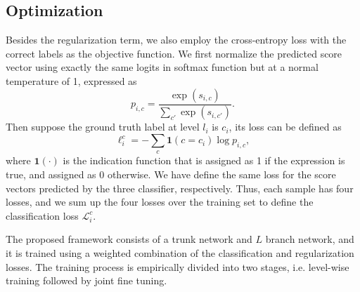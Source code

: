 \documentclass[sigconf]{acmart}
\begin{document}
\subsection{Optimization}
Besides the regularization term, we also employ the cross-entropy loss with the correct labels as the objective function. We first normalize the predicted score vector using exactly the same logits in softmax function but at a normal temperature of 1, expressed as 
\begin{equation}
    p_{i,c}=\frac{\exp({s_{i,c}})}{\sum_{c'}{\exp({s_{i,c'}})}}.
\end{equation}
Then suppose the ground truth label at level $l_i$ is $c_i$, its loss can be defined as
\begin{equation}
    \ell_i^c=-\sum_{c}\mathbf{1}(c=c_i)\log{p_{i,c}},
\end{equation}
where $\mathbf{1}(\cdot)$ is the indication function that is assigned as 1 if the expression is true, and assigned as 0 otherwise. We have define the same loss for the score vectors predicted by the three classifier, respectively. Thus, each sample has four losses, and we sum up the four losses over the training set to define the classification loss $\mathcal{L}_i^c$.



The proposed framework consists of a trunk network and $L$ branch network, and it is trained using a weighted combination of the classification and regularization losses. The training process is empirically divided into two stages, i.e. level-wise training followed by joint fine tuning.
\end{document}
